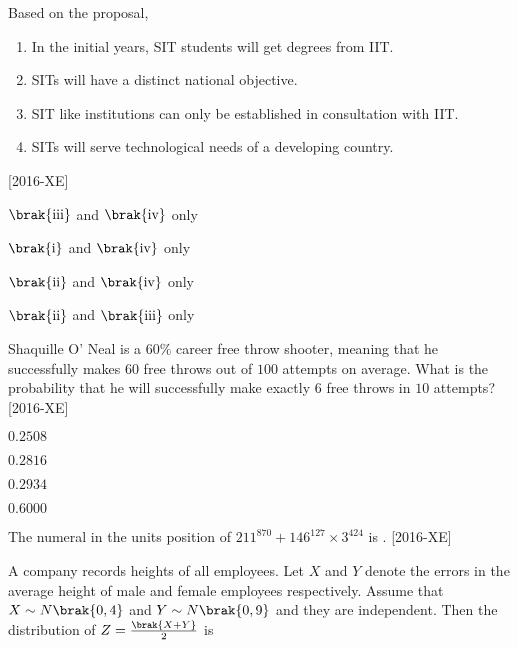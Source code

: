 Based on the proposal, 
\begin{enumerate}[label=(\roman*), leftmargin=3em, labelsep=0.5em, itemindent=1.5em]
    \item In the initial years, SIT students will get degrees from IIT.
    \item SITs will have a distinct national objective.
    \item SIT like institutions can only be established in consultation with IIT.
    \item SITs will serve technological needs of a developing country.
\end{enumerate}
\hfill{[2016-XE]}
\begin{enumerate}
\begin{multicols}{2}
\item $\brak{\text{iii}}$ and $\brak{\text{iv}}$ only
\item $\brak{\text{i}}$ and $\brak{\text{iv}}$ only
\item $\brak{\text{ii}}$ and $\brak{\text{iv}}$ only
\item $\brak{\text{ii}}$ and $\brak{\text{iii}}$ only
\end{multicols}
\end{enumerate}
\item Shaquille O' Neal is a $60\%$ career free throw shooter, meaning that he successfully makes 60 free throws out of $100$ attempts on average. What is the probability that he will successfully make exactly $6$ free throws in $10$ attempts? \hfill{[2016-XE]}\\
\begin{enumerate}
\begin{multicols}{4}
\item $0.2508$
\item $0.2816$
\item $0.2934$
\item $0.6000$
\end{multicols}
\end{enumerate}
\item The numeral in the units position of $211^{870}+146^{127}\times3^{424}$ is \underline{\hspace{1cm}}. \hfill{[2016-XE]}\\
\item A company records heights of all employees. Let $X$ and $Y$ denote the errors in the average height of male and female employees respectively. Assume that $X\sim N\brak{0,4}$ and $Y\sim N\brak{0,9}$ and they are independent. Then the distribution of $Z=\frac{\brak{X+Y}}{2}$ is 

